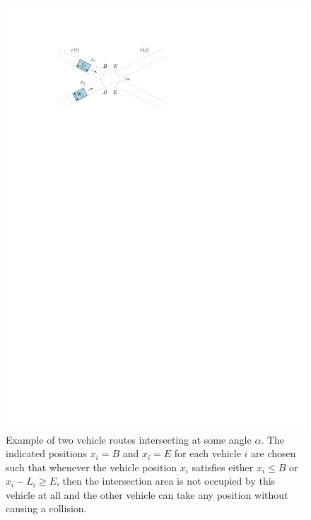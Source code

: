 \documentclass[a4paper]{report}
\theoremstyle{definition}
\theoremstyle{plain}
\begin{document}
\begin{figure}[b]
  \centering
  \includegraphics[scale=1.0]{figures/intersection-non-axis-aligned-annotated}
  \caption{Example of two vehicle routes intersecting at some angle $\alpha$. The
    indicated positions $x_{i} = B$ and $x_{i} = E$ for each vehicle $i$ are
    chosen such that whenever the vehicle position $x_{i}$ satisfies either
    $x_{i} \leq B$ or $x_{i} - L_{i} \geq E$, then the intersection area is not
    occupied by this vehicle at all and the other vehicle can take any position
    without causing a collision.}%
  \label{fig:intersection-non-axis-aligned}
\end{figure}
\end{document}
